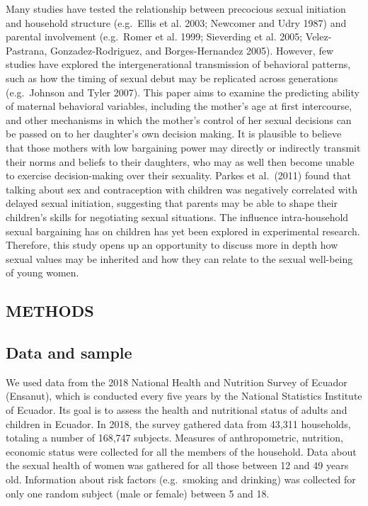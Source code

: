 \documentclass[
]{article}
\begin{document}
Many studies have tested the relationship between precocious sexual
initiation and household structure (e.g.~Ellis et al. 2003; Newcomer and
Udry 1987) and parental involvement (e.g.~Romer et al. 1999; Sieverding
et al. 2005; Velez-Pastrana, Gonzadez-Rodriguez, and Borges-Hernandez
2005). However, few studies have explored the intergenerational
transmission of behavioral patterns, such as how the timing of sexual
debut may be replicated across generations (e.g.~Johnson and Tyler
2007). This paper aims to examine the predicting ability of maternal
behavioral variables, including the mother's age at first intercourse,
and other mechanisms in which the mother's control of her sexual
decisions can be passed on to her daughter's own decision making. It is
plausible to believe that those mothers with low bargaining power may
directly or indirectly transmit their norms and beliefs to their
daughters, who may as well then become unable to exercise
decision-making over their sexuality. Parkes et al.~(2011) found that
talking about sex and contraception with children was negatively
correlated with delayed sexual initiation, suggesting that parents may
be able to shape their children's skills for negotiating sexual
situations. The influence intra-household sexual bargaining has on
children has yet been explored in experimental research. Therefore, this
study opens up an opportunity to discuss more in depth how sexual values
may be inherited and how they can relate to the sexual well-being of
young women.

\hypertarget{methods}{%
\subsection{METHODS}\label{methods}}

\hypertarget{data-and-sample}{%
\subsection{Data and sample}\label{data-and-sample}}

We used data from the 2018 National Health and Nutrition Survey of
Ecuador (Ensanut), which is conducted every five years by the National
Statistics Institute of Ecuador. Its goal is to assess the health and
nutritional status of adults and children in Ecuador. In 2018, the
survey gathered data from 43,311 households, totaling a number of
168,747 subjects. Measures of anthropometric, nutrition, economic status
were collected for all the members of the household. Data about the
sexual health of women was gathered for all those between 12 and 49
years old. Information about risk factors (e.g.~smoking and drinking)
was collected for only one random subject (male or female) between 5 and
18.
\end{document}
